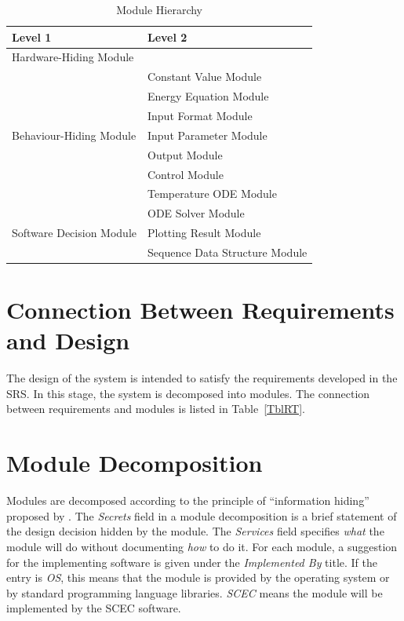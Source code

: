 \documentclass[12pt, titlepage]{article}
\begin{document}
\begin{table}[h!]
\centering
\begin{tabular}{p{} p{}}
\toprule
\textbf{Level 1} & \textbf{Level 2}\\
\midrule
{Hardware-Hiding Module} & ~ \\
\midrule

\multirow{7}{0.3\textwidth}{Behaviour-Hiding Module} 
& Constant Value Module\\ 
& Energy Equation Module\\
& Input Format Module\\
& Input Parameter Module\\
& Output Module\\
& Control Module\\
& Temperature ODE Module\\
\midrule

\multirow{3}{0.3\textwidth}{Software Decision Module} 
& ODE Solver Module\\
& Plotting Result Module\\
& Sequence Data Structure Module\\
\bottomrule

\end{tabular}
\caption{Module Hierarchy}
\label{TblMH}
\end{table}

\section{Connection Between Requirements and Design} \label{SecConnection}

The design of the system is intended to satisfy the requirements developed in
the SRS. In this stage, the system is decomposed into modules. The connection
between requirements and modules is listed in Table~\ref{TblRT}.

\section{Module Decomposition} \label{SecMD}

Modules are decomposed according to the principle of ``information hiding''
proposed by \citet{ParnasEtAl1984}. The \emph{Secrets} field in a module
decomposition is a brief statement of the design decision hidden by the
module. The \emph{Services} field specifies \emph{what} the module will do
without documenting \emph{how} to do it. For each module, a suggestion for the
implementing software is given under the \emph{Implemented By} title. If the
entry is \emph{OS}, this means that the module is provided by the operating
system or by standard programming language libraries.  \emph{SCEC} means the
module will be implemented by the SCEC software.
\end{document}
